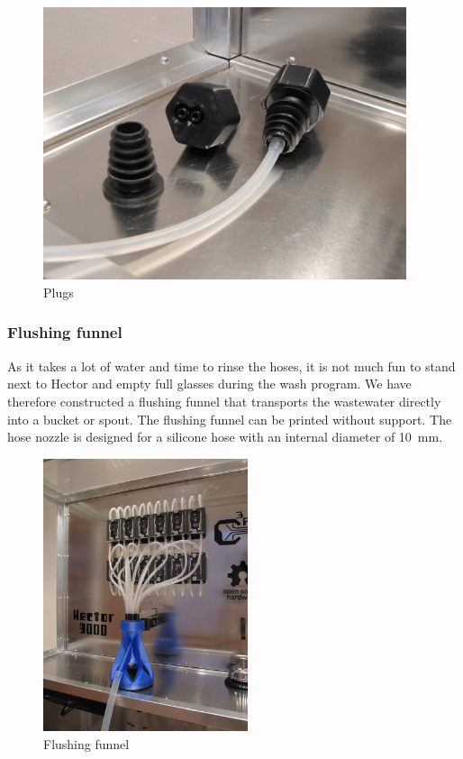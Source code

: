 \documentclass[a4paper]{scrartcl}
\begin{document}
\begin{figure}
  \centering
  \includegraphics[height=8cm]{pics/plugs}
  \caption{Plugs} \label{plugs}
\end{figure}

\subsubsection{Flushing funnel}
As it takes a lot of water and time to rinse the hoses, it is not much fun to stand next to Hector and empty full glasses during the wash program. We have therefore constructed a flushing funnel that transports the wastewater directly into a bucket or spout. The flushing funnel can be printed without support. The hose nozzle is designed for a silicone hose with an internal diameter of \SI{10}{\milli\metre}.

\begin{figure}
  \centering
  \includegraphics[height=8cm]{pics/funnel.JPG}
  \caption{Flushing funnel} \label{funnel}
\end{figure}
\end{document}
